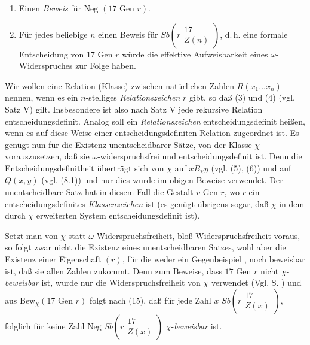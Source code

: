 \documentclass[draft]{scrartcl}
\begin{document}
\begin{enumerate}
	\item Einen \textit{Beweis} für $\text{Neg }\left(17 \text{ Gen } r\right)$.
	\item Für jedes beliebige $n$ einen Beweis für $Sb\left(r\substack{17\\ Z\left(n\right)}\right)$, d.\,h. eine formale Entscheidung von $17\text{ Gen } r$ würde die effektive Aufweisbarkeit eines $\omega$-Widerspruches zur Folge haben.
\end{enumerate}

Wir wollen eine Relation (Klasse) zwischen natürlichen Zahlen $R\left(x_1 \dots x_n\right)$
 nennen, wenn es ein $n$-stelliges \textit{Relationszeichen} $r$ gibt,
so daß (3) und (4) (vgl. Satz V) gilt.
Insbesondere ist also nach Satz V jede rekursive Relation
entscheidungsdefinit. Analog soll ein \textit{Relationszeichen} entscheidungsdefinit
 heißen, wenn es auf diese Weise einer entscheidungsdefiniten Relation zugeordnet ist.
Es genügt nun für die Existenz unentscheidbarer Sätze, von der Klasse $\chi$ vorauszusetzen,
daß sie $\omega$-widerspruchsfrei und entscheidungsdefinit ist. Denn die
Entscheidungsdefinitheit überträgt sich von $\chi$ auf $x B_\chi y$ (vgl. (5), (6)) und
auf $Q\left(x, y\right)$ (vgl. (8.1)) und nur dies wurde im obigen Beweise verwendet.
Der unentscheidbare Satz hat in diesem Fall die Gestalt $v\text{ Gen } r$, wo $r$ ein
entscheidungsdefinites \textit{Klassenzeichen} ist (es genügt übrigens sogar,
daß $\chi$ in dem durch $\chi$ erweiterten System entscheidungsdefinit ist).

Setzt man von $\chi$ statt $\omega$-Widerspruchsfreiheit, bloß
Widerspruchsfreiheit voraus, so folgt zwar nicht die Existenz
 eines unentscheidbaren Satzes, wohl aber die Existenz einer
Eigenschaft $\left(r\right)$, für die weder ein Gegenbeispiel
, noch beweisbar ist, daß sie allen Zahlen zukommt.
Denn zum Beweise, dass $17\text{ Gen } r$ nicht
$\chi$-\textit{beweisbar} ist, wurde nur die Widerspruchsfreiheit
von $\chi$ verwendet (Vgl. S. \pageref{chibeweisbarkeit}) und aus
 $\overline{\text{Bew}_\chi}\left(17\text{ Gen } r\right)$ folgt
nach (15), daß für jede Zahl $x$
$Sb\left(r\substack{17\\ Z\left(x\right)}\right)$, folglich für
 keine Zahl $\text{Neg }Sb\left(r\substack{17\\ Z\left(x\right)}\right)$ $\chi$-\textit{beweisbar} ist.
\end{document}
